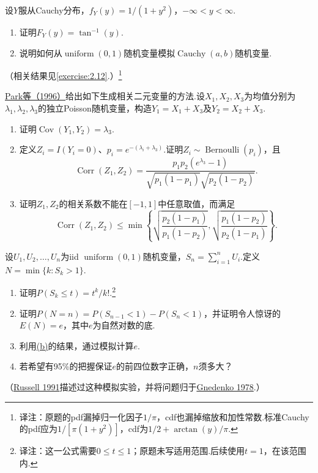 \begin{exercise}\label{exercise:5.56}
设$Y$服从Cauchy分布，$f_Y(y)=1/(1+y^2)$，$-\infty<y<\infty$.
\begin{enumerate}[label=(\alph*)]\item 证明$F_Y(y)=\tan^{-1}(y)$.\item 说明如何从$\operatorname{uniform}(0,1)$随机变量模拟$\operatorname{Cauchy}(a,b)$随机变量.\end{enumerate}
（相关结果见\autoref{exercise:2.12}.）\footnote{译注：原题的pdf漏掉归一化因子$1/\pi$，cdf也漏掉缩放和加性常数.标准Cauchy的pdf应为$1/[\pi(1+y^2)]$，cdf为$1/2+\arctan(y)/\pi$.}
\end{exercise}
\begin{exercise}\label{exercise:5.57}
\hyperref[bib:source239]{Park等（1996）}给出如下生成相关二元变量的方法.设$X_1,X_2,X_3$为均值分别为$\lambda_1,\lambda_2,\lambda_3$的独立Poisson随机变量，构造$Y_1=X_1+X_3$及$Y_2=X_2+X_3$.
\begin{enumerate}[label=(\alph*)]
\item 证明$\operatorname{Cov}(Y_1,Y_2)=\lambda_3$.
\item 定义$Z_i=I(Y_i=0)$、$p_i=e^{-(\lambda_i+\lambda_3)}$.证明$Z_i\sim\operatorname{Bernoulli}(p_i)$，且
$$\operatorname{Corr}(Z_1,Z_2)=\frac{p_1p_2(e^{\lambda_3}-1)}{\sqrt{p_1(1-p_1)}\sqrt{p_2(1-p_2)}}.$$
\item 证明$Z_1,Z_2$的相关系数不能在$[-1,1]$中任意取值，而满足
$$\operatorname{Corr}(Z_1,Z_2)\le\min\left\{\sqrt{\frac{p_2(1-p_1)}{p_1(1-p_2)}},\sqrt{\frac{p_1(1-p_2)}{p_2(1-p_1)}}\right\}.$$
\end{enumerate}
\end{exercise}
\begin{exercise}\label{exercise:5.58}
设$U_1,U_2,\ldots,U_n$为iid $\operatorname{uniform}(0,1)$随机变量，$S_n=\sum_{i=1}^nU_i$.定义$N=\min\{k:S_k>1\}$.
\begin{enumerate}[label=(\alph*)]
\item 证明$P(S_k\le t)=t^k/k!$.\footnote{译注：这一公式需要$0\le t\le1$；原题未写适用范围.后续使用$t=1$，在该范围内.}
\item{}\label{itm:exercise:5.58:b} 证明$P(N=n)=P(S_{n-1}<1)-P(S_n<1)$，并证明令人惊讶的$E(N)=e$，其中$e$为自然对数的底.
\item 利用\hyperref[itm:exercise:5.58:b]{(b)}的结果，通过模拟计算$e$.
\item 若希望有95\%的把握保证$e$的前四位数字正确，$n$须多大？
\end{enumerate}
（\hyperref[bib:source270]{Russell 1991}描述过这种模拟实验，并将问题归于\hyperref[bib:source151]{Gnedenko 1978}.）
\end{exercise}
